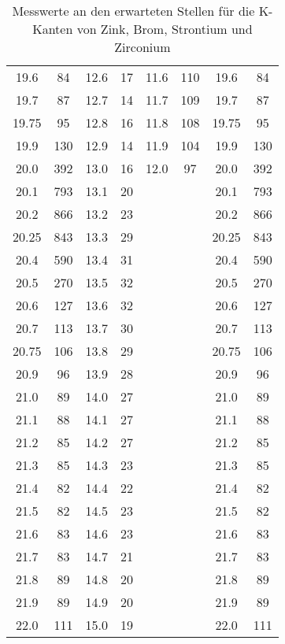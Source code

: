 \begin{table}
\begin{tabular}{SS[table-format=3.0] | SS[table-format=3.0] | SS[table-format=3.0] | SS[table-format=3.0]}
        19.6    &  84    & 12.6  & 17    & 11.6  & 110  & 19.6  &  84 \\   
        19.7    &  87    & 12.7  & 14    & 11.7  & 109  & 19.7  &  87 \\   
        19.75   &  95    & 12.8  & 16    & 11.8  & 108  & 19.75 &  95 \\   
        19.9    & 130    & 12.9  & 14    & 11.9  & 104  & 19.9  & 130 \\   
        20.0    & 392    & 13.0  & 16    & 12.0  & 97   & 20.0  & 392 \\   
        20.1    & 793    & 13.1  & 20    &       &      & 20.1  & 793 \\   
        20.2    & 866    & 13.2  & 23    &       &      & 20.2  & 866 \\   
        20.25   & 843    & 13.3  & 29    &       &      & 20.25 & 843 \\   
        20.4    & 590    & 13.4  & 31    &       &      & 20.4  & 590 \\   
        20.5    & 270    & 13.5  & 32    &       &      & 20.5  & 270 \\   
        20.6    & 127    & 13.6  & 32    &       &      & 20.6  & 127 \\   
        20.7    & 113    & 13.7  & 30    &       &      & 20.7  & 113 \\   
        20.75   & 106    & 13.8  & 29    &       &      & 20.75 & 106 \\   
        20.9    &  96    & 13.9  & 28    &       &      & 20.9  &  96 \\   
        21.0    &  89    & 14.0  & 27    &       &      & 21.0  &  89 \\   
        21.1    &  88    & 14.1  & 27    &       &      & 21.1  &  88 \\   
        21.2    &  85    & 14.2  & 27    &       &      & 21.2  &  85 \\   
        21.3    &  85    & 14.3  & 23    &       &      & 21.3  &  85 \\   
        21.4    &  82    & 14.4  & 22    &       &      & 21.4  &  82 \\   
        21.5    &  82    & 14.5  & 23    &       &      & 21.5  &  82 \\   
        21.6    &  83    & 14.6  & 23    &       &      & 21.6  &  83 \\   
        21.7    &  83    & 14.7  & 21    &       &      & 21.7  &  83 \\   
        21.8    &  89    & 14.8  & 20    &       &      & 21.8  &  89 \\   
        21.9    &  89    & 14.9  & 20    &       &      & 21.9  &  89 \\   
        22.0    & 111    & 15.0  & 19    &       &      & 22.0  & 111 \\   
        \bottomrule
    \end{tabular}
    \caption{Messwerte an den erwarteten Stellen für die K-Kanten von Zink, Brom, Strontium und Zirconium}
    \label{tab:c04_absorption}
\end{table}